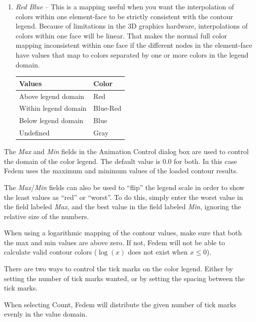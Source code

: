 \begin{enumerate}
\item{\sl Red Blue} --
  This is a mapping useful when you want the interpolation of colors within one
  element-face to be strictly consistent with the contour legend.
  Because of limitations in the 3D graphics hardware, interpolations of colors
  within one face will be linear. That makes the normal full color mapping
  inconsistent within one face if the different nodes in the element-face
  have values that map to colors separated by one or more colors in the legend
  domain.

  \begin{tabular}{ | m{4.0cm} | m{3cm} | }
    \hline
    Values               & Color \\
    \hline\hline
    Above legend domain  & Red \\
    \hline
    Within legend domain & Blue-Red \\
    \hline
    Below legend domain  & Blue \\
    \hline
    Undefined            & Gray \\
    \hline
  \end{tabular}

\end{enumerate}


The {\sl Max} and {\sl Min} fields in the Animation Control dialog box are used
to control the domain of the color legend. The default value is 0.0 for both.
In this case Fedem uses the maximum and minimum values of the loaded contour
results.

The {\sl Max}/{\sl Min} fields can also be used to ``flip'' the legend scale in
order to show the least values as ``red'' or ``worst''. To do this,
simply enter the worst value in the field labeled {\sl Max}, and the best value
in the field labeled {\sl Min}, ignoring the relative size of the numbers.

When using a logarithmic mapping of the contour values, make sure that both the
max and min values are above zero. If not, Fedem will not be able to calculate
valid contour colors ($\log(x)$ does not exist when $x\leq0$).


There are two ways to control the tick marks on the color legend.
Either by setting the number of tick marks wanted, or by setting the spacing
between the tick marks.

When selecting Count, Fedem will distribute the given number of tick marks
evenly in the value domain.

